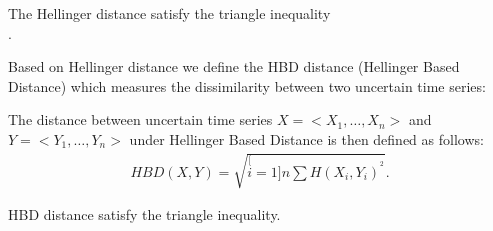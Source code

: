 \begin{theorem}
\label{hellinger}
The Hellinger distance satisfy the triangle inequality\\ \cite{ibragimov2013statistical}.
\end{theorem}

Based on Hellinger distance we define the HBD distance (Hellinger Based Distance) which measures the dissimilarity between two uncertain time series:

\begin{definition}
The distance between uncertain time series $X=<X_1, \ldots,X_n>$ and $Y=<Y_1, \ldots,Y_n>$ under
Hellinger Based Distance is then defined as follows:
\begin{eqnarray}
HBD(X,Y)=\sqrt{\stackrel[i=1]{n}{\sum}H(X_{i},Y_{i})^{^{2}}}.
\end{eqnarray} 
\end{definition}

\begin{theorem}
HBD distance satisfy the triangle inequality.
\end{theorem}

